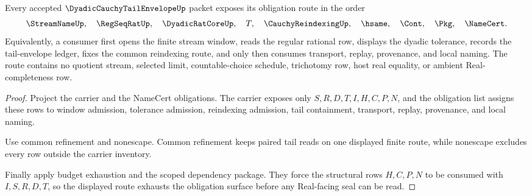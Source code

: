 \begin{theorem}
\label{thm:dyadic-cauchy-tail-envelope-obligation-route}
Every accepted $\DyadicCauchyTailEnvelopeUp$ packet exposes its obligation route in the order
$$
\StreamNameUp,\quad \RegSeqRatUp,\quad \DyadicRatCoreUp,\quad T,\quad \CauchyReindexingUp,\quad \hsame,\quad \Cont,\quad \Pkg,\quad \NameCert .
$$
Equivalently, a consumer first opens the finite stream window, reads the regular rational row, displays the dyadic tolerance, records the tail-envelope ledger, fixes the common reindexing route, and only then consumes transport, replay, provenance, and local naming. The route contains no quotient stream, selected limit, countable-choice schedule, trichotomy row, host real equality, or ambient Real-completeness row.
\end{theorem}
\begin{proof}
Project the carrier and the NameCert obligations. The carrier exposes only $S,R,D,T,I,H,C,P,N$, and the obligation list assigns these rows to window admission, tolerance admission, reindexing admission, tail containment, transport, replay, provenance, and local naming.

Use common refinement and nonescape. Common refinement keeps paired tail reads on one displayed finite route, while nonescape excludes every row outside the carrier inventory.

Finally apply budget exhaustion and the scoped dependency package. They force the structural rows $H,C,P,N$ to be consumed with $I,S,R,D,T$, so the displayed route exhausts the obligation surface before any Real-facing seal can be read.
\end{proof}

